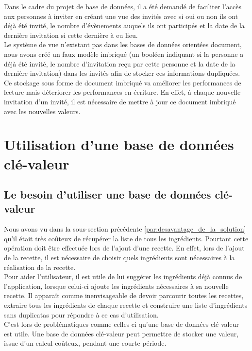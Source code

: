 		Dans le cadre du projet de base de données, il a été demandé de faciliter l'accès aux personnes à inviter en créant une vue des invités avec si oui ou non ils ont déjà été invité, le nombre d'évènements auquels ils ont participés et la date de la dernière invitation si cette dernière à eu lieu.\\

		Le système de vue n'existant pas dans les bases de données orientées document, nous avons créé un faux modèle imbriqué (un booléen indiquant si la personne a déjà été invité, le nombre d'invitation reçu par cette personne et la date de la dernière invitation) dans les invités afin de stocker ces informations dupliquées. Ce stockage sous forme de document imbriqué va améliorer les performances de lecture mais déteriorer les performances en écriture. En effet, à chaque nouvelle invitation d'un invité, il est nécessaire de mettre à jour ce document imbriqué avec les nouvelles valeurs.


\section{Utilisation d'une base de données clé-valeur}
	\subsection{Le besoin d'utiliser une base de données clé-valeur }
		Nous avons vu dans la sous-section précédente \ref{par:desavantage_de_la_solution} qu'il était très coûteux de récupérer la liste de tous les ingrédients. Pourtant cette opération doit être effectuée lors de l'ajout d'une recette. En effet, lors de l'ajout de la recette, il est nécessaire de choisir quels ingrédients sont nécessaires à la réalisation de la recette.\\

		Pour aider l'utilisateur, il est utile de lui suggérer les ingrédients déjà connus de l'application, lorsque celui-ci ajoute les ingrédients nécessaires à sa nouvelle recette. Il apparaît comme inenvisageable de devoir parcourir toutes les recettes, extraire tous les ingrédients de chaque recette et construire une liste d'ingrédients sans duplicatas pour répondre à ce cas d'utilisation.\\

		C'est lors de problématiques comme celles-ci qu'une base de données clé-valeur est utile. Une base de données clé-valeur peut permettre de stocker une valeur, issue d'un calcul coûteux, pendant une courte période.

